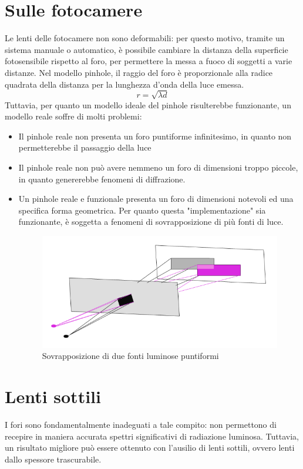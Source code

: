 \documentclass{report}
\begin{document}
	\section{Sulle fotocamere}
	Le lenti delle fotocamere non sono deformabili: per questo motivo, tramite un sistema manuale o automatico, è possibile cambiare la distanza della superficie fotosensibile rispetto al foro, per permettere la messa a fuoco di soggetti a varie distanze.
	Nel modello pinhole, il raggio del foro è proporzionale alla radice quadrata della distanza per la lunghezza d'onda della luce emessa.
	$$
	r = \sqrt{\lambda d}
	$$
	Tuttavia, per quanto un modello ideale del pinhole risulterebbe funzionante, un modello reale soffre di molti problemi:
	\begin{itemize}
		\item Il pinhole reale non presenta un foro puntiforme infinitesimo, in quanto non permetterebbe il passaggio della luce
		\item Il pinhole reale non può avere nemmeno un foro di dimensioni troppo piccole, in quanto genererebbe fenomeni di diffrazione.
		\item Un pinhole reale e funzionale presenta un foro di dimensioni notevoli ed una specifica forma geometrica. Per quanto questa "implementazione" sia funzionante, è soggetta a fenomeni di sovrapposizione di più fonti di luce.
		      \begin{figure}[htp]
		      	\centering
		      	\includegraphics[width=0.75\linewidth]{sovrapposizione.png}
		      	\caption{Sovrapposizione di due fonti luminose puntiformi}
		      \end{figure}
	\end{itemize}
		
	\section{Lenti sottili}
	I fori sono fondamentalmente inadeguati a tale compito: non permettono di recepire in maniera accurata spettri significativi di radiazione luminosa.
	Tuttavia, un risultato migliore può essere ottenuto con l'ausilio di lenti sottili, ovvero lenti dallo spessore trascurabile.
\end{document}
